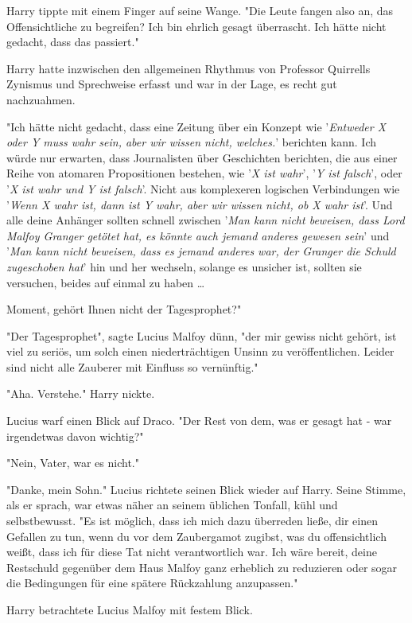 {Harry tippte mit einem Finger auf seine Wange. "Die Leute fangen also an, das Offensichtliche zu begreifen? Ich bin ehrlich gesagt überrascht. Ich hätte nicht gedacht, dass das passiert."

Harry hatte inzwischen den allgemeinen Rhythmus von Professor Quirrells Zynismus und Sprechweise erfasst und war in der Lage, es recht gut nachzuahmen.

"Ich hätte nicht gedacht, dass eine Zeitung über ein Konzept wie '\emph{Entweder X oder Y muss wahr sein, aber wir wissen nicht, welches.}' berichten kann. Ich würde nur erwarten, dass Journalisten über Geschichten berichten, die aus einer Reihe von atomaren Propositionen bestehen, wie '\emph{X ist wahr}', '\emph{Y ist falsch}', oder '\emph{X ist wahr und Y ist falsch}'. Nicht aus komplexeren logischen Verbindungen wie '\emph{Wenn X wahr ist, dann ist Y wahr, aber wir wissen nicht, ob X wahr ist}'. Und alle deine Anhänger sollten schnell zwischen '\emph{Man kann nicht beweisen, dass Lord Malfoy Granger getötet hat, es könnte auch jemand anderes gewesen sein}' und '\emph{Man kann nicht beweisen, dass es jemand anderes war, der Granger die Schuld zugeschoben hat}' hin und her wechseln, solange es unsicher ist, sollten sie versuchen, beides auf einmal zu haben …

Moment, gehört Ihnen nicht der Tagesprophet?"

"Der Tagesprophet", sagte Lucius Malfoy dünn, "der mir gewiss nicht gehört, ist viel zu seriös, um solch einen niederträchtigen Unsinn zu veröffentlichen. Leider sind nicht alle Zauberer mit Einfluss so vernünftig."

"Aha. Verstehe." Harry nickte.

Lucius warf einen Blick auf Draco. "Der Rest von dem, was er gesagt hat - war irgendetwas davon wichtig?"

"Nein, Vater, war es nicht."

"Danke, mein Sohn." Lucius richtete seinen Blick wieder auf Harry. Seine Stimme, als er sprach, war etwas näher an seinem üblichen Tonfall, kühl und selbstbewusst. "Es ist möglich, dass ich mich dazu überreden ließe, dir einen Gefallen zu tun, wenn du vor dem Zaubergamot zugibst, was du offensichtlich weißt, dass ich für diese Tat nicht verantwortlich war. Ich wäre bereit, deine Restschuld gegenüber dem Haus Malfoy ganz erheblich zu reduzieren oder sogar die Bedingungen für eine spätere Rückzahlung anzupassen."

Harry betrachtete Lucius Malfoy mit festem Blick.

}
